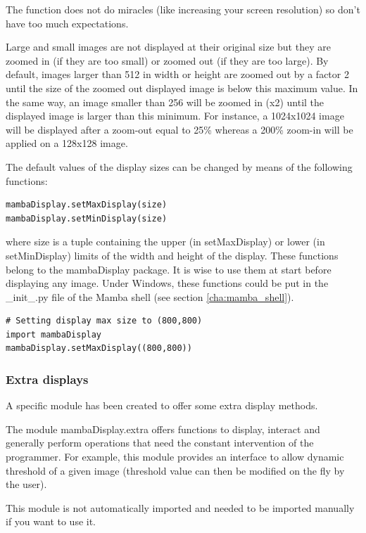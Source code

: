\documentclass[a4paper,10pt,oneside]{article}
\begin{document}
The function does not do miracles (like increasing your screen resolution) so
don't have too much expectations.

Large and small images are not displayed at their original size but they are
zoomed in (if they are too small) or zoomed out (if they are too large). By
default, images larger than 512 in width or height are zoomed out by a factor 2
until the size of the zoomed out displayed image is below this maximum value.
In the same way, an image smaller than 256 will be zoomed in (x2) until
the displayed image is larger than this minimum. For instance, a 1024x1024 image
will be displayed after a zoom-out equal to 25\% whereas a 200\% zoom-in will be
applied on a 128x128 image.

The default values of the display sizes can be changed by means of the following
functions:

\lstset{language=Python}
\begin{lstlisting}
mambaDisplay.setMaxDisplay(size)
mambaDisplay.setMinDisplay(size)
\end{lstlisting}

where size is a tuple containing the upper (in setMaxDisplay) or lower (in
setMinDisplay) limits of the width and height of the display.
These functions belong to the mambaDisplay package. It is wise to use them at
start before displaying any image. Under Windows, these functions could be put
in the \_init\_.py file of the Mamba shell (see section \ref{cha:mamba_shell}).

\lstset{language=Python}
\begin{lstlisting}
# Setting display max size to (800,800)
import mambaDisplay
mambaDisplay.setMaxDisplay((800,800))
\end{lstlisting}

\subsubsection{Extra displays}

A specific module has been created to offer some extra display methods.

The module mambaDisplay.extra offers functions to display, interact and generally 
perform operations that need the constant intervention of the programmer. For
example, this module provides an interface to allow dynamic threshold of a given
image (threshold value can then be modified on the fly by the user).

This module is not automatically imported and needed to be imported manually if
you want to use it.
\end{document}
